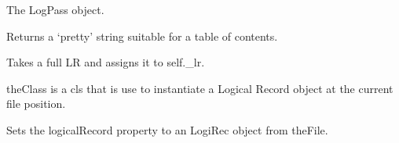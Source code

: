 \documentclass[letterpaper,10pt,english]{sphinxmanual}
\begin{document}
\begin{fulllineitems}
\begin{fulllineitems}
\end{fulllineitems}


\begin{fulllineitems}
\label{\detokenize{ref/LIS/core/FileIndexer:TotalDepth.LIS.core.FileIndexer.IndexLogPass.logPass}}
The LogPass object.

\end{fulllineitems}


\begin{fulllineitems}
\label{\detokenize{ref/LIS/core/FileIndexer:TotalDepth.LIS.core.FileIndexer.IndexLogPass.tocStr}}
Returns a ‘pretty’ string suitable for a table of contents.

\end{fulllineitems}


\end{fulllineitems}


\begin{fulllineitems}
\label{\detokenize{ref/LIS/core/FileIndexer:TotalDepth.LIS.core.FileIndexer.IndexLrFull}}
Takes a full LR and assigns it to self.\_lr.

theClass is a cls that is use to instantiate a Logical Record object at the current file position.

\begin{fulllineitems}
\label{\detokenize{ref/LIS/core/FileIndexer:TotalDepth.LIS.core.FileIndexer.IndexLrFull.setLogicalRecord}}
Sets the logicalRecord property to an LogiRec object from theFile.

\end{fulllineitems}


\end{fulllineitems}

\end{document}
